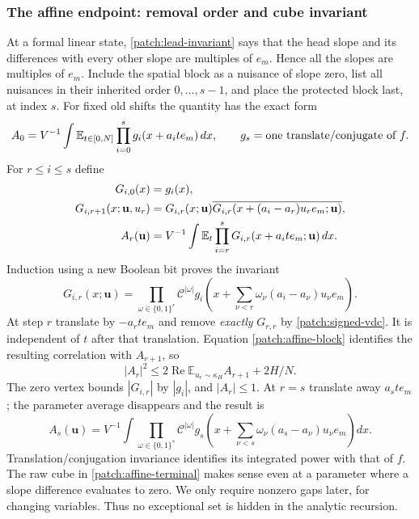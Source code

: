 \documentclass[11pt]{article}
\theoremstyle{definition}
\begin{document}
\subsubsection{The affine endpoint: removal order and cube invariant}
At a formal linear state, \eqref{patch:lead-invariant} says that the head slope and its differences
with every other slope are multiples of $e_m$.  Hence all the slopes are multiples of $e_m$.
Include the spatial block as a nuisance of slope zero, list all nuisances in their inherited
order $0,\ldots,s-1$, and place the protected block last, at index $s$.
For fixed old shifts the quantity has the exact form
\[
 A_0=V^{-1}\int\mathbb E_{t\in[0,N]}\prod_{i=0}^{s}g_i(x+a_it e_m)\,dx,
 \qquad g_s=\hbox{one translate/conjugate of }f.
\]
For $r\leq i\leq s$ define
\begin{align}
 G_{i,0}(x)&=g_i(x),\notag\\
 G_{i,r+1}(x;\mathbf u,u_r)&=G_{i,r}(x;\mathbf u)
     \overline{G_{i,r}(x+(a_i-a_r)u_re_m;\mathbf u)},\label{patch:affine-block}\\
 A_r(\mathbf u)&=V^{-1}\int\mathbb E_t
           \prod_{i=r}^sG_{i,r}(x+a_it e_m;\mathbf u)\,dx.\notag
\end{align}
Induction using a new Boolean bit proves the invariant
\begin{equation}\label{patch:affine-cube-invariant}
 G_{i,r}(x;\mathbf u)=\prod_{\omega\in\{0,1\}^r}\mathcal C^{|\omega|}
        g_i\left(x+\sum_{\nu<r}\omega_\nu(a_i-a_\nu)u_\nu e_m\right).
\end{equation}
At step $r$ translate by $-a_rt e_m$ and remove \emph{exactly} $G_{r,r}$ by
\cref{patch:signed-vdc}.  It is independent of $t$ after that translation.
Equation \eqref{patch:affine-block} identifies the resulting correlation with $A_{r+1}$, so
\[
 |A_r|^2\leq2\operatorname{Re}\mathbb E_{u_r\sim\kappa_H}A_{r+1}+2H/N.
\]
The zero vertex bounds $|G_{i,r}|$ by $|g_i|$, and $|A_r|\leq1$.
At $r=s$ translate away $a_st e_m$; the parameter average disappears and the result is
\begin{equation}\label{patch:affine-terminal}
 A_s(\mathbf u)=V^{-1}\int
     \prod_{\omega\in\{0,1\}^s}\mathcal C^{|\omega|}
         g_s\left(x+\sum_{\nu<s}\omega_\nu(a_s-a_\nu)u_\nu e_m\right)dx.
\end{equation}
Translation/conjugation invariance identifies its integrated power with that of $f$.
The raw cube in \eqref{patch:affine-terminal} makes sense even at a parameter where a slope
difference evaluates to zero.  We only require nonzero gaps later, for changing variables.
Thus no exceptional set is hidden in the analytic recursion.
\end{document}
